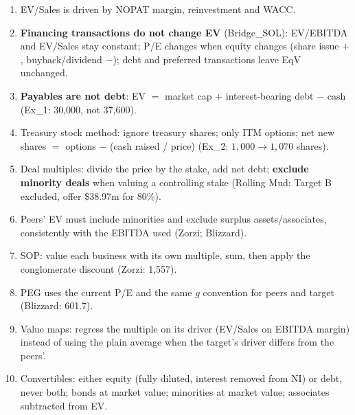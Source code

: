 \begin{trapbox}
\begin{enumerate}[leftmargin=*]
  \item EV/Sales is driven by NOPAT margin, reinvestment and WACC.
  \item \textbf{Financing transactions do not change EV} (Bridge\_SOL): EV/EBITDA and EV/Sales stay constant; P/E changes when equity changes (share issue $+$, buyback/dividend $-$); debt and preferred transactions leave EqV unchanged.
  \item \textbf{Payables are not debt}: EV $=$ market cap $+$ interest-bearing debt $-$ cash (Ex\_1: 30,000, not 37,600).
  \item Treasury stock method: ignore treasury shares; only ITM options; net new shares $=$ options $-$ (cash raised / price) (Ex\_2: $1{,}000\to1{,}070$ shares).
  \item Deal multiples: divide the price by the stake, add net debt; \textbf{exclude minority deals} when valuing a controlling stake (Rolling Mud: Target B excluded, offer \$38.97m for 80\%).
  \item Peers' EV must include minorities and exclude surplus assets/associates, consistently with the EBITDA used (Zorzi; Blizzard).
  \item SOP: value each business with its own multiple, sum, then apply the conglomerate discount (Zorzi: 1,557).
  \item PEG uses the current P/E and the same $g$ convention for peers and target (Blizzard: 601.7).
  \item Value maps: regress the multiple on its driver (EV/Sales on EBITDA margin) instead of using the plain average when the target's driver differs from the peers'.
  \item Convertibles: either equity (fully diluted, interest removed from NI) or debt, never both; bonds at market value; minorities at market value; associates subtracted from EV.
\end{enumerate}
\end{trapbox}
